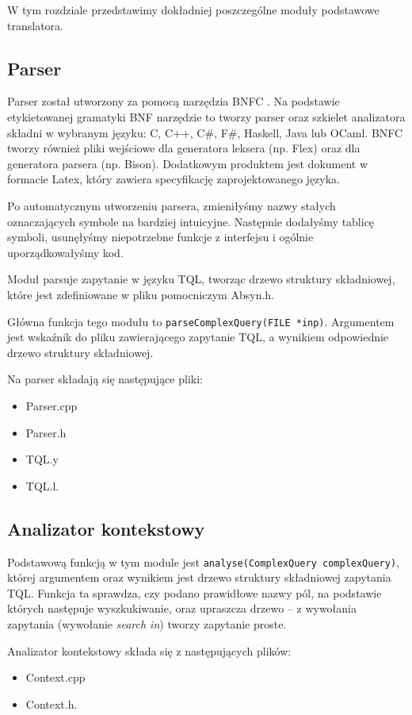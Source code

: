W tym rozdziale przedstawimy dokładniej poszczególne moduły podstawowe translatora.

\subsection{Parser}
Parser został utworzony za pomocą narzędzia BNFC \cite{bnfc}. Na podstawie etykietowanej gramatyki BNF 
narzędzie to tworzy parser oraz szkielet analizatora składni w wybranym języku: C, C++, C\#, F\#, Haskell, Java lub OCaml. 
BNFC tworzy również pliki wejściowe dla generatora leksera (np. Flex) oraz dla generatora parsera (np. Bison). 
Dodatkowym produktem jest dokument w formacie Latex, który zawiera specyfikację zaprojektowanego języka.


Po automatycznym utworzeniu parsera, 
zmieniłyśmy nazwy stałych oznaczających symbole na bardziej intuicyjne.
Następnie
dodałyśmy tablicę symboli,
usunęłyśmy niepotrzebne funkcje z interfejsu
i ogólnie uporządkowałyśmy kod.

Moduł  parsuje zapytanie w języku TQL, tworząc drzewo struktury składniowej, które jest zdefiniowane w pliku pomocniczym Absyn.h.

Główna funkcja tego modułu to \verb|parseComplexQuery(FILE *inp)|. Argumentem jest wskaźnik do pliku zawierającego zapytanie TQL, 
a wynikiem odpowiednie drzewo struktury składniowej.

Na parser składają się następujące pliki:
\begin{itemize}
 \item Parser.cpp
 \item Parser.h
 \item TQL.y %
 \item TQL.l. %
\end{itemize}


\subsection{Analizator kontekstowy}
Podstawową funkcją w tym module jest \verb|analyse(ComplexQuery complexQuery)|, której argumentem oraz wynikiem jest 
drzewo struktury składniowej zapytania TQL. Funkcja ta
 sprawdza, czy podano prawidłowe nazwy pól, na podstawie których następuje wyszkukiwanie,  %
oraz upraszcza drzewo -- z wywołania zapytania (wywołanie \textit{search in}) tworzy zapytanie proste.

Analizator kontekstowy składa się z następujących plików:
\begin{itemize}
 \item Context.cpp
 \item Context.h.
\end{itemize}

